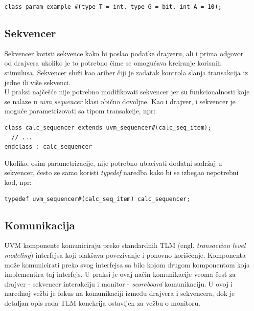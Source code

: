 \begin{lstlisting}
class param_example #(type T = int, type G = bit, int A = 10);
\end{lstlisting}


\subsection{Sekvencer}

Sekvencer koristi sekvence kako bi poslao podatke drajveru, ali i prima odgovor
od drajvera ukoliko je to potrebno čime se omogućava kreiranje korisnih
stimulusa. Sekvencer služi kao ariber čiji je zadatak kontrola slanja
transakcija iz jedne ili više sekvenci.\\

U praksi najčešće nije potrebno modifikovati sekvencer jer su funkcionalnosti
koje se nalaze u \emph{uvm\(\_\)sequencer} klasi obično dovoljne. Kao i drajver,
i sekvencer je moguće parametrizovati sa tipom transakcije, npr:

\begin{lstlisting}
class calc_sequencer extends uvm_sequencer#(calc_seq_item);
  // ...
endclass : calc_sequencer
\end{lstlisting}

Ukoliko, osim parametrizacije, nije potrebno ubacivati dodatni sadržaj u
sekvencer, često se samo koristi \emph{typedef} naredba kako bi se izbegao
nepotrebni kod, npr:

\begin{lstlisting}
typedef uvm_sequencer#(calc_seq_item) calc_sequencer;
\end{lstlisting}


\subsection{Komunikacija}

UVM komponente komuniciraju preko standardnih TLM (engl. \emph{transaction level
  modeling}) interfejsa koji olakšava povezivanje i ponovno korišćenje.
Komponenta može komunicirati preko svog interfejsa sa bilo kojom drugom
komponentom koja implementira taj interfejs. U praksi je ovaj način komunikacije
veoma čest za drajver - sekvencer interakciju i monitor - \emph{scoreboard}
komunikaciju. U ovoj i narednoj vežbi je fokus na komunikaciji između drajvera
i sekvencera, dok je detaljan opis rada TLM konekcija ostavljen za vežbu o
monitoru.\\

